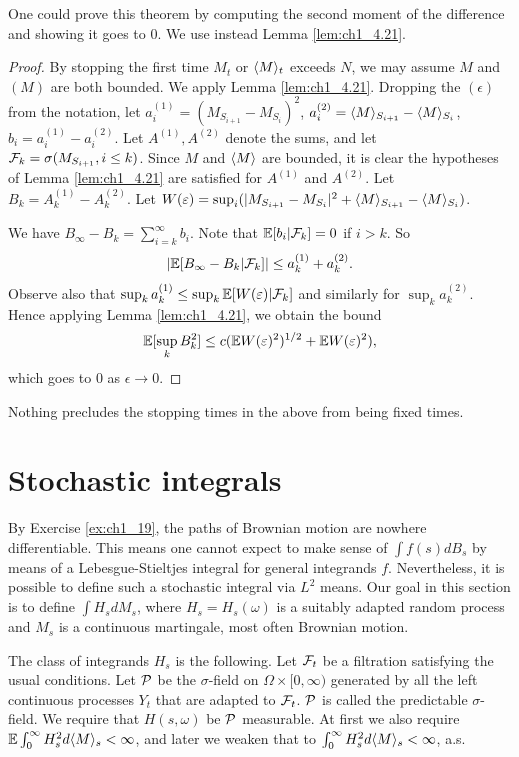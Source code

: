 One could prove this theorem by computing the second moment of the difference and showing it goes to $0$. We use instead Lemma \ref{lem:ch1_4.21}.

\begin{proof}
By stopping the first time $M_t$ or $\langle M \rangle_t$ exceeds $N$, we may assume $M$ and $(M)$ are both bounded. We apply Lemma \ref{lem:ch1_4.21}. Dropping the $(\epsilon)$ from the notation, let $a_i^{(1)} = (M_{S_{i+1}} - M_{S_i})^2$, $a_i^{(2)} = \langle M \rangle_{S_{i+1}} - \langle M \rangle_{S_i}$, $b_i = a_i^{(1)} - a_i^{(2)}$. Let $A^{(1)},A^{(2)}$ denote the sums, and let $\mathcal{F}_k = \sigma(M_{S_{i+1}}, i \leq k)$. Since $M$ and $\langle M \rangle$ are bounded, it is clear the hypotheses of Lemma \ref{lem:ch1_4.21} are satisfied for $A^{(1)}$ and $A^{(2)}$. Let $B_k = A_k^{(1)} - A_k^{(2)}$. Let $W(\varepsilon) = \sup_i(|M_{S_{i+1}} - M_{S_i}|^2 + \langle M \rangle_{S_{i+1}} -\langle M \rangle_{S_i})$.

We have $B_\infty - B_k = \sum_{i=k}^{\infty} b_i$. Note that $\mathbb{E}[b_i| \mathcal{F}_k] = 0$ if $i > k$. So
\[
    |\mathbb{E}[B_\infty - B_k| \mathcal{F}_k]| \leq a_k^{(1)} + a_k^{(2)}.
\]
Observe also that $\sup_k a_k^{(1)} \leq \sup_k \mathbb{E}[W(\varepsilon)| \mathcal{F}_k]$ and similarly for $\sup_k a_k^{(2)}$. Hence applying Lemma \ref{lem:ch1_4.21}, we obtain the bound
\[
    \mathbb{E}[\sup_k B_k^2] \leq c(\mathbb{E} W(\varepsilon)^2)^{1/2} + \mathbb{E} W(\varepsilon)^2),
\]
which goes to $0$ as $\epsilon \to 0$.
\end{proof}

Nothing precludes the stopping times in the above from being fixed times.

\section{Stochastic integrals}\label{ch1_sec5}



By Exercise \ref{ex:ch1_19}, the paths of Brownian motion are nowhere differentiable. This means one cannot expect to make sense of $\int f(s)dB_s$ by means of a Lebesgue-Stieltjes integral for general integrands $f$. Nevertheless, it is possible to define such a stochastic integral via $L^2$ means. Our goal in this section is to define $\int H_s dM_s$, where $H_s = H_s(\omega)$ is a suitably adapted random process and $M_s$ is a continuous martingale, most often Brownian motion.

The class of integrands $H_s$ is the following. Let $\mathcal{F}_t$ be a filtration satisfying the usual conditions. Let $\mathcal{P}$ be the $\sigma$-field on $\Omega \times [0,\infty)$ generated by all the left continuous processes $Y_t$ that are adapted to $\mathcal{F}_t$. $\mathcal{P}$ is called the predictable $\sigma$-field. We require that $H(s,\omega)$ be $\mathcal{P}$ measurable. At first we also require $\mathbb{E} \int_0^\infty H_s^2 d\langle M \rangle_s < \infty$, and later we weaken that to $\int_0^\infty H_s^2 d\langle M \rangle_s < \infty$, a.s.


